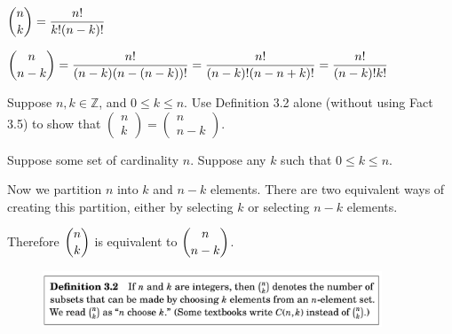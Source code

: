 \documentclass[openany, 12pt]{book}
\begin{document}
\begin{exercise}{}{}
	\begin{alist}
		\item $\dbinom{n}{k}=\dfrac{n!}{k!(n-k)!}$
		\item $\dbinom{n}{n-k}=\dfrac{n!}{(n-k)(n-(n-k))!}=\dfrac{n!}{(n-k)!(n-n+k)!}=\dfrac{n!}{(n-k)!k!}$
	\end{alist}
\end{exercise}

\begin{exercise}{}{}
	Suppose $n, k \in \mathbb{Z}$, and $0 \leq k \leq n$. Use Definition 3.2
	alone (without using Fact 3.5) to show that $\left(\begin{array}{l}n \\
				k\end{array}\right)=\left(\begin{array}{c}n \\ n-k\end{array}\right)$.
	\begin{alist}
		\item Suppose some set of cardinality $n$.  Suppose any $k$ such that $0 \leq k \leq n$.
		\item Now we partition $n$ into $k$ and $n-k$ elements. There are two
		equivalent ways of creating this partition, either by selecting $k$ or
		selecting $n-k$ elements.
		\item Therefore $\dbinom{n}{k}$ is equivalent to $\dbinom{n}{n-k}$.
	\end{alist}
\end{exercise}

\begin{figure}
	\centering
	\includegraphics[width=0.9\textwidth]{images/definition03_02.png}
	\label{fig:mypicture}
\end{figure}
\end{document}
